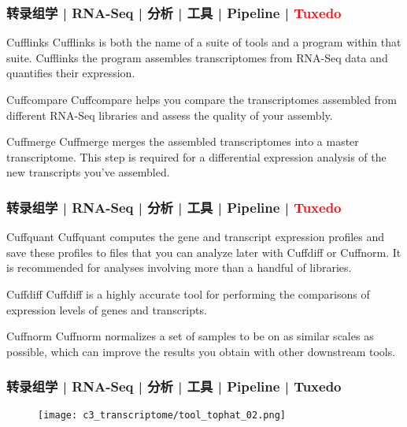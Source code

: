\begin{frame}
  \frametitle{转录组学 | RNA-Seq | 分析 | 工具 | Pipeline | \textcolor{red}{Tuxedo}}
  \begin{block}{Cufflinks}
    Cufflinks is both the name of a suite of tools and a program within that suite. Cufflinks the program assembles transcriptomes from RNA-Seq data and quantifies their expression.
  \end{block}
  \pause
  \begin{block}{Cuffcompare}
    Cuffcompare helps you compare the transcriptomes assembled from different RNA-Seq libraries and assess the quality of your assembly.
  \end{block}
  \pause
  \begin{block}{Cuffmerge}
    Cuffmerge merges the assembled transcriptomes into a master transcriptome. This step is required for a differential expression analysis of the new transcripts you've assembled.
  \end{block}
\end{frame}

\begin{frame}
  \frametitle{转录组学 | RNA-Seq | 分析 | 工具 | Pipeline | \textcolor{red}{Tuxedo}}
  \begin{block}{Cuffquant}
    Cuffquant computes the gene and transcript expression profiles and save these profiles to files that you can analyze later with Cuffdiff or Cuffnorm. It is recommended for analyses involving more than a handful of libraries.
  \end{block}
  \pause
  \begin{block}{Cuffdiff}
    Cuffdiff is a highly accurate tool for performing the comparisons of expression levels of genes and transcripts.
  \end{block}
  \pause
  \begin{block}{Cuffnorm}
    Cuffnorm normalizes a set of samples to be on as similar scales as possible, which can improve the results you obtain with other downstream tools.
  \end{block}
\end{frame}

\begin{frame}
  \frametitle{转录组学 | RNA-Seq | 分析 | 工具 | Pipeline | Tuxedo}
  \begin{figure}
    \centering
    \texttt{[image: c3\_transcriptome/tool\_tophat\_02.png]}
  \end{figure}
\end{frame}

